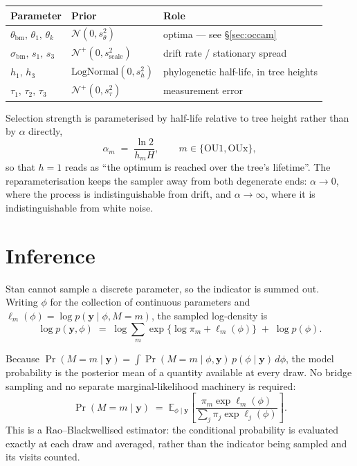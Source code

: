 \documentclass[11pt]{article}
\newcommand{\yv}{\mathbf{y}}
\newcommand{\OUo}{\mathrm{OU1}}
\newcommand{\OUx}{\mathrm{OUx}}
\newcommand{\E}{\mathbb{E}}
\begin{document}
\begin{center}
\begin{tabular}{@{}lll@{}}
\toprule
Parameter & Prior & Role \\
\midrule
$\theta_{\mathrm{bm}},\,\theta_{1},\,\theta_{k}$ & $\mathcal{N}(0, s_{\theta}^{2})$ & optima --- see \S\ref{sec:occam} \\
$\sigma_{\mathrm{bm}},\, s_{1},\, s_{3}$ & $\mathcal{N}^{+}(0, s_{\mathrm{scale}}^{2})$ & drift rate / stationary spread \\
$h_{1},\, h_{3}$ & $\mathrm{LogNormal}(0, s_{h}^{2})$ & phylogenetic half-life, in tree heights \\
$\tau_{1},\, \tau_{2},\, \tau_{3}$ & $\mathcal{N}^{+}(0, s_{\tau}^{2})$ & measurement error \\
\bottomrule
\end{tabular}
\end{center}

\noindent
Selection strength is parameterised by half-life relative to tree height rather than by $\alpha$
directly,
\begin{equation}
\alpha_{m} \;=\; \frac{\ln 2}{h_{m} H}, \qquad m \in \{\OUo, \OUx\},
\end{equation}
so that $h = 1$ reads as ``the optimum is reached over the tree's lifetime''. The reparameterisation
keeps the sampler away from both degenerate ends: $\alpha \to 0$, where the process is
indistinguishable from drift, and $\alpha \to \infty$, where it is indistinguishable from white noise.

\section{Inference}

Stan cannot sample a discrete parameter, so the indicator is summed out. Writing $\phi$ for the
collection of continuous parameters and $\ell_{m}(\phi) = \log p(\yv \mid \phi, M = m)$, the sampled
log-density is
\begin{equation}
\log p(\yv, \phi) \;=\; \log \sum_{m} \exp\bigl\{\log \pi_{m} + \ell_{m}(\phi)\bigr\} \;+\; \log p(\phi).
\end{equation}

Because $\Pr(M = m \mid \yv) = \int \Pr(M = m \mid \phi, \yv)\, p(\phi \mid \yv)\, d\phi$, the model
probability is the posterior mean of a quantity available at every draw. No bridge sampling and no
separate marginal-likelihood machinery is required:
\begin{equation}
\Pr(M = m \mid \yv) \;=\; \E_{\phi \mid \yv}
   \left[\frac{\pi_{m}\exp \ell_{m}(\phi)}{\sum_{j} \pi_{j}\exp \ell_{j}(\phi)}\right].
\label{eq:pm}
\end{equation}
This is a Rao--Blackwellised estimator: the conditional probability is evaluated exactly at each
draw and averaged, rather than the indicator being sampled and its visits counted.
\end{document}
